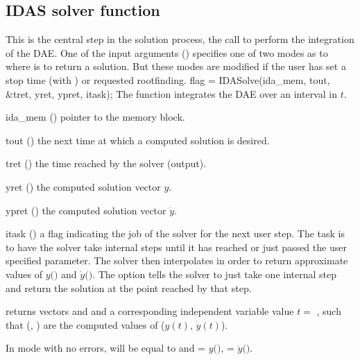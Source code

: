 {\subsection{IDAS solver function}\label{sss:idasolve}
%
This is the central step in the solution process, the call to perform the
integration of the DAE.  One of the input arguments ()
specifies one of two modes as to where {\idas} is to return a solution.
But these modes are modified if the user has set a stop time (with
) or requested rootfinding.
%
{
  flag = IDASolve(ida\_mem, tout, \&tret, yret, ypret, itask);
}
{
  The function  integrates the DAE over an interval in $t$.
}
{
  \begin{args}
  \item[ida\_mem] ()
    pointer to the {\idas} memory block.
  \item[tout] ()
    the next time at which a computed solution is desired.
  \item[tret] ()
    the time reached by the solver (output).
  \item[yret] ()
    the computed solution vector $y$.
  \item[ypret] ()
    the computed solution vector $\dot{y}$.
  \item[itask] ()
    a flag indicating the job of the solver for the next user step. 
    The  task is to have the solver take internal steps until   
    it has reached or just passed the user specified 
    parameter. The solver then interpolates in order to   
    return approximate values of $y($$)$ and $\dot{y}($$)$. 
    The  option tells the solver to just take one internal step  
    and return the solution at the point reached by that step. 
  \end{args}
}
{
   returns vectors  and  and a
  corresponding independent variable value $t =$ , such that (,
  ) are the computed values of ($y(t)$, $\dot{y}(t)$).

  In  mode with no errors,  will be equal to  
  and  = $y($$)$,  = $\dot{y}($$)$.

}}
